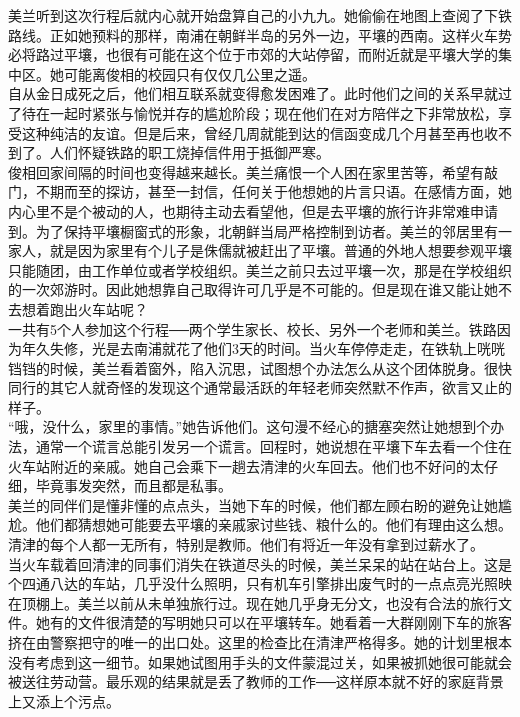 美兰听到这次行程后就内心就开始盘算自己的小九九。她偷偷在地图上查阅了下铁路线。正如她预料的那样，南浦在朝鲜半岛的另外一边，平壤的西南。这样火车势必将路过平壤，也很有可能在这个位于市郊的大站停留，而附近就是平壤大学的集中区。她可能离俊相的校园只有仅仅几公里之遥。\\

自从金日成死之后，他们相互联系就变得愈发困难了。此时他们之间的关系早就过了待在一起时紧张与愉悦并存的尴尬阶段；现在他们在对方陪伴之下非常放松，享受这种纯洁的友谊。但是后来，曾经几周就能到达的信函变成几个月甚至再也收不到了。人们怀疑铁路的职工烧掉信件用于抵御严寒。\\

俊相回家间隔的时间也变得越来越长。美兰痛恨一个人困在家里苦等，希望有敲门，不期而至的探访，甚至一封信，任何关于他想她的片言只语。在感情方面，她内心里不是个被动的人，也期待主动去看望他，但是去平壤的旅行许非常难申请到。为了保持平壤橱窗式的形象，北朝鲜当局严格控制到访者。美兰的邻居里有一家人，就是因为家里有个儿子是侏儒就被赶出了平壤。普通的外地人想要参观平壤只能随团，由工作单位或者学校组织。美兰之前只去过平壤一次，那是在学校组织的一次郊游时。因此她想靠自己取得许可几乎是不可能的。但是现在谁又能让她不去想着跑出火车站呢？\\

一共有5个人参加这个行程──两个学生家长、校长、另外一个老师和美兰。铁路因为年久失修，光是去南浦就花了他们3天的时间。当火车停停走走，在铁轨上咣咣铛铛的时候，美兰看着窗外，陷入沉思，试图想个办法怎么从这个团体脱身。很快同行的其它人就奇怪的发现这个通常最活跃的年轻老师突然默不作声，欲言又止的样子。\\

“哦，没什么，家里的事情。”她告诉他们。这句漫不经心的搪塞突然让她想到个办法，通常一个谎言总能引发另一个谎言。回程时，她说想在平壤下车去看一个住在火车站附近的亲戚。她自己会乘下一趟去清津的火车回去。他们也不好问的太仔细，毕竟事发突然，而且都是私事。\\

美兰的同伴们是懂非懂的点点头，当她下车的时候，他们都左顾右盼的避免让她尴尬。他们都猜想她可能要去平壤的亲戚家讨些钱、粮什么的。他们有理由这么想。清津的每个人都一无所有，特别是教师。他们有将近一年没有拿到过薪水了。\\

当火车载着回清津的同事们消失在铁道尽头的时候，美兰呆呆的站在站台上。这是个四通八达的车站，几乎没什么照明，只有机车引擎排出废气时的一点点亮光照映在顶棚上。美兰以前从未单独旅行过。现在她几乎身无分文，也没有合法的旅行文件。她有的文件很清楚的写明她只可以在平壤转车。她看着一大群刚刚下车的旅客挤在由警察把守的唯一的出口处。这里的检查比在清津严格得多。她的计划里根本没有考虑到这一细节。如果她试图用手头的文件蒙混过关，如果被抓她很可能就会被送往劳动营。最乐观的结果就是丢了教师的工作──这样原本就不好的家庭背景上又添上个污点。\\

